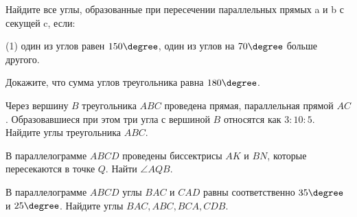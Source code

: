 %
%
%
\begin{class}[number=1]
	\begin{listofex}
		\item Найдите все углы, образованные при пересечении параллельных прямых a и b с секущей c, если:
		\begin{tasks}(1)
			\task один из углов равен \(150 \degree\),
			\task один из углов на \(70 \degree\) больше другого.
		\end{tasks}
		\item Докажите, что сумма углов треугольника равна \(180 \degree\).
		\item Через вершину \(B\) треугольника \(ABC\) проведена прямая, параллельная прямой \(AC\). Образовавшиеся при этом три угла с вершиной \(B\) относятся как \(3:10:5\). Найдите углы треугольника \(ABC\).
		\item В параллелограмме \(ABCD\) проведены биссектрисы \(AK\) и \(BN\), которые пересекаются в точке \(Q\). Найти \(\angle AQB\).
		\item В параллелограмме \(ABCD\) углы \(BAC\) и \(CAD\) равны соответственно \(35 \degree\) и \(25 \degree\). Найдите углы \(BAC, ABC, BCA, CDB\).
	\end{listofex}
\end{class}

\begin{class}[number=2]
	\begin{listofex}
		\item 
	\end{listofex}
\end{class}

\begin{homework}[number=1]
	\begin{listofex}
		\item 
	\end{listofex}
\end{homework}

\begin{class}[number=3]
	\begin{listofex}
		\item 
	\end{listofex}
\end{class}

